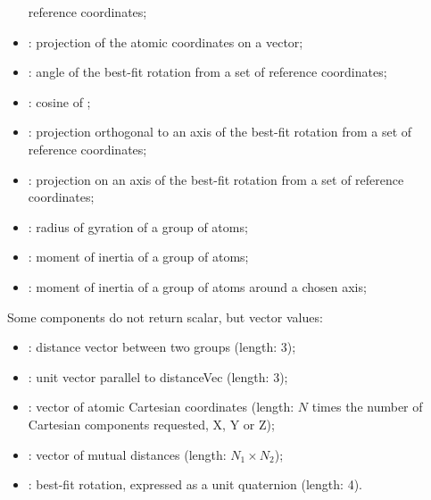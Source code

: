 \begin{itemize}
  reference coordinates;
\item {}: projection of the atomic coordinates on a
  vector;
\ifdefined{}\fi
\item {}: angle of the best-fit rotation from
  a set of reference coordinates;
\item {}: cosine of ;
\item {}: projection orthogonal to an axis of the best-fit rotation
  from a set of reference coordinates;
\item {}: projection on an axis of the best-fit rotation
  from a set of reference coordinates;
\item {}: radius of gyration of a group of atoms;
\item {}: moment of inertia of a group of atoms;
\item {}: moment of inertia of a group of atoms around a chosen axis;
\end{itemize}

Some components do not return scalar, but vector values:
\begin{itemize}
\item {}: distance vector between two groups (length: 3);
\item {}: unit vector parallel to distanceVec (length: 3);
\item {}: vector of atomic Cartesian coordinates (length: $N$ times the number of Cartesian components requested, X, Y or Z);
\item {}: vector of mutual distances (length: $N_{\mathrm{1}}\times{}N_{\mathrm{2}}$);
\item {}: best-fit rotation, expressed as a unit quaternion (length: 4).
\end{itemize}

